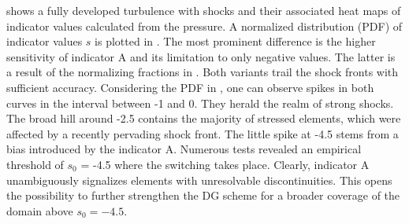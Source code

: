  shows a fully developed turbulence with shocks and
their associated heat maps of indicator values calculated from the pressure.  A
normalized distribution (PDF) of indicator values $s$ is plotted in
.  The most prominent difference is the higher
sensitivity of indicator A and its limitation to only negative values. The
latter is a result of the normalizing fractions in . Both
variants trail the shock fronts with sufficient accuracy. Considering the PDF
in , one can observe spikes in both curves in the
interval between -1 and 0. They herald the realm of strong shocks. The broad
hill around -2.5 contains the majority of stressed elements, which were affected
by a recently pervading shock front.  The little spike at -4.5 stems from a
bias introduced by the indicator A. Numerous tests revealed an empirical
threshold of $s_0$ = -4.5 where the switching takes place. Clearly, indicator A
unambiguously signalizes elements with unresolvable discontinuities. This opens
the possibility to further strengthen the DG scheme for a broader coverage of
the domain above $s_0 = -4.5$.
